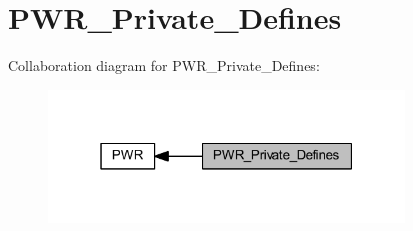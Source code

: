 \hypertarget{group___p_w_r___private___defines}{}\section{P\+W\+R\+\_\+\+Private\+\_\+\+Defines}
\label{group___p_w_r___private___defines}
Collaboration diagram for P\+W\+R\+\_\+\+Private\+\_\+\+Defines\+:
\nopagebreak
\begin{figure}[H]
\begin{center}
\leavevmode
\includegraphics[width=268pt]{group___p_w_r___private___defines}
\end{center}
\end{figure}
